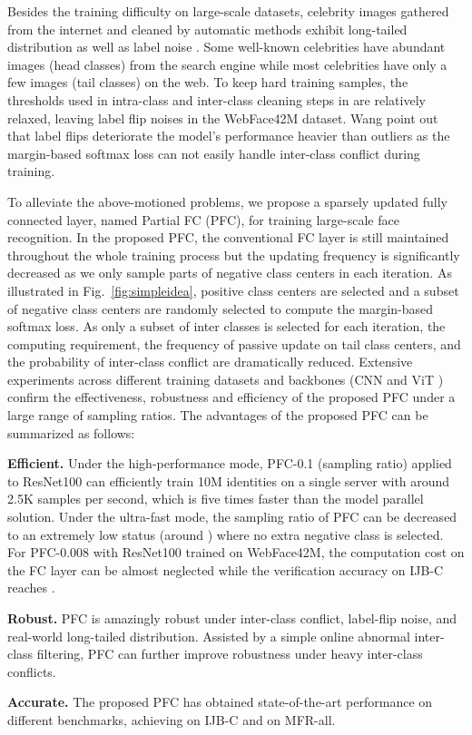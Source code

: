 \documentclass[10pt,twocolumn,letterpaper]{article}
\newenvironment{tight_itemize}{
\begin{itemize}[leftmargin=20pt]
\setlength{\topsep}{0pt}
\setlength{\itemsep}{0pt}
\setlength{\parskip}{0pt}
\setlength{\parsep}{0pt}
}{\end{itemize}}
\begin{document}
Besides the training difficulty on large-scale datasets, celebrity images gathered from the internet and cleaned by automatic methods \cite{zhu2021webface260m,MillionCelebs} exhibit long-tailed distribution \cite{liu2019adaptiveface,zhong2019unequal} as well as label noise \cite{wang2018devil}. Some well-known celebrities have abundant images (head classes) from the search engine while most celebrities have only a few images (tail classes) on the web. To keep hard training samples, the thresholds used in intra-class and inter-class cleaning steps in \cite{zhu2021webface260m} are relatively relaxed, leaving label flip noises in the WebFace42M dataset. Wang \etal \cite{wang2018devil} point out that label flips deteriorate the model's performance heavier than outliers as the margin-based softmax loss can not easily handle inter-class conflict during training.

To alleviate the above-motioned problems, we propose a sparsely updated fully connected layer, named Partial FC (PFC), for training large-scale face recognition. In the proposed PFC, the conventional FC layer is still maintained throughout the whole training process but the updating frequency is significantly decreased as we only sample parts of negative class centers in each iteration. As illustrated in Fig.~\ref{fig:simpleidea}, positive class centers are selected and a subset of negative class centers are randomly selected to compute the margin-based softmax loss. As only a subset of inter classes is selected for each iteration, the computing requirement, the frequency of passive update on tail class centers, and the probability of inter-class conflict are dramatically reduced. Extensive experiments across different training datasets and backbones (\eg CNN \cite{he2016deep} and ViT \cite{dosovitskiy2020image}) confirm the effectiveness, robustness and efficiency of the proposed PFC under a large range of sampling ratios.
The advantages of the proposed PFC can be summarized as follows:
\vspace{-0.2cm}
\begin{tight_itemize}
\item {\bf Efficient.} Under the high-performance mode, PFC-0.1 (sampling ratio) applied to ResNet100 can efficiently train 10M identities on a single server with around 2.5K samples per second, which is five times faster than the model parallel solution. Under the ultra-fast mode, the sampling ratio of PFC can be decreased to an extremely low status (around ) where no extra negative class is selected. For PFC-0.008 with ResNet100 trained on WebFace42M, the computation cost on the FC layer can be almost neglected while the verification accuracy on IJB-C reaches . 
\item {\bf Robust.} PFC is amazingly robust under inter-class conflict, label-flip noise, and real-world long-tailed distribution. Assisted by a simple online abnormal inter-class filtering, PFC can further improve robustness under heavy inter-class conflicts.
\item {\bf Accurate.} The proposed PFC has obtained state-of-the-art performance on different benchmarks,
achieving  on IJB-C and  on MFR-all. 
\end{tight_itemize}
\end{document}
